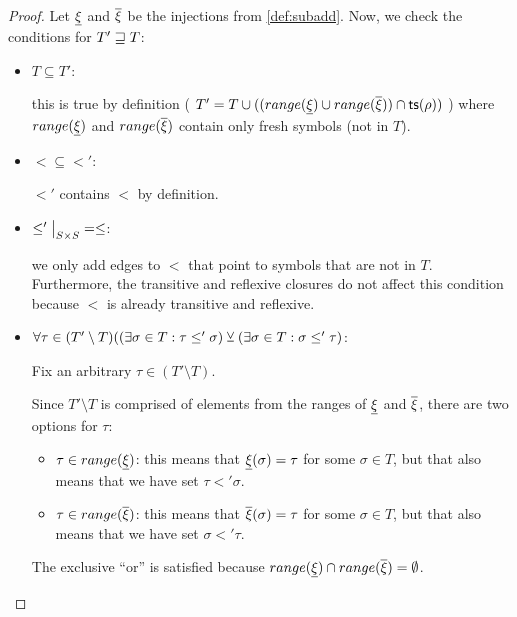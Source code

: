 \documentclass[main.tex]{subfiles}
\begin{document}
\begin{proof}
    Let $\underline{\xi}$ and $\overline{\xi}$ be the injections from \cref{def:subadd}.
    Now, we check the conditions for $T' \sqsupseteq T$:
    \begin{itemize}
        \item $T \subseteq T'$:

            this is true by definition (
            $T' = T \cup ((range(\underline{\xi}) \cup range(\overline{\xi})) \cap \mathsf{ts}(\rho))$
            ) where $range(\underline{\xi})$ and $range(\overline{\xi})$ contain
            only fresh symbols (not in $T$).

        \item $\less \subseteq \less'$:

            $\less'$ contains $\less$ by definition.

        \item $\restr{\less'}{S \times S} = \less$:

            we only add edges to $\less$ that point to symbols that are not
            in $T$. Furthermore, the transitive and reflexive closures do not
            affect this condition because $\less$ is already transitive and
            reflexive.

        \item $\forall \tau \in (T' \setminus T) ((\exists \sigma \in T : \tau \leq' \sigma )
            \veebar (\exists \sigma \in T : \sigma \leq' \tau)$:

            Fix an arbitrary $\tau \in (T' \setminus T)$.

            Since $T' \setminus T$ is comprised of elements from the ranges
            of $\underline{\xi}$ and $\overline{\xi}$, there are two options
            for $\tau$:
            \begin{itemize}
                \item $\tau \in range(\underline{\xi})$: this means that
                    $\underline{\xi}(\sigma) = \tau$ for some $\sigma \in T$, but that
                    also means that we have set $\tau \less' \sigma$.
                \item $\tau \in range(\overline{\xi})$: this means that
                    $\overline{\xi}(\sigma) = \tau$ for some $\sigma \in T$, but that
                    also means that we have set $\sigma \less' \tau$.
            \end{itemize}

            The exclusive ``or'' is satisfied because
            $range(\underline{\xi}) \cap range(\overline{\xi}) = \emptyset$.
    \end{itemize}
\end{proof}
\end{document}
